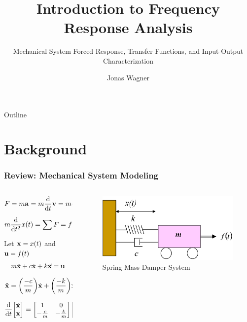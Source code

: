 \documentclass[aspectratio=169]{beamer}
\title[Frequency Response Analysis]{Introduction to Frequency Response Analysis}
\subtitle{Mechanical System Forced Response, Transfer Functions, and Input-Output Characterization}
\author{Jonas Wagner}
\institute[UTDallas]{The University of Texas at Dallas}
\date{}
\begin{document}
	
\begin{frame}
	\titlepage
\end{frame}


\begin{frame}{Outline}
	\tableofcontents
	\note{

	}
\end{frame}

\section{Background}
\begin{frame}
	\frametitle{Review: Mechanical System Modeling}
	\begin{columns}
		\begin{column}{0.5 \textwidth}
			\[F = m \vb{a} = m \dv{t} \vb{v} = m \dv{t} \qty(\dv{t} \vb{x})\]
			\[
				m \dv{t^2} x(t) 
				= \sum F 
				= f(t) - b \dv{t} x(t) - k x(t)
			\]

			Let $\vb{x} = x(t)$ and $\vb{u} = f(t)$
			\[
				m \ddot{\vb{x}} + c \dot{\vb{x}} + k \va{x} = \vb{u}
			\]
			\[
				\ddot{\vb{x}} 
				= \qty(\frac{-c}{m}) \dot{\vb{x}} + \qty(\frac{-k}{m}) \vb{x} + \qty(\cfrac{1}{m}) \vb{u}
			\]
			\[
				\dv{t} \mqty[
					\dot{\vb{x}}\\ 
					\vb{x}
				 ] = 
				\mqty[
					1 &0\\
					-\frac{c}{m} &-\frac{k}{m}
					] 
				\mqty[
					\dot{\vb{x}}\\
					\vb{x}
				]
				+ \mqty[
					0\\
					\frac{1}{m}
				]
				\mqty[\vb{u}]
			\]
		\end{column}
		\begin{column}{0.375 \textwidth}
			\begin{figure}[]
				\includegraphics[width=\textwidth]{Images/SpringMassDamper_cartSystem.png}
				Spring Mass Damper System \cite{ctms_engin_umich_SystemModeling}
			\end{figure}
		\end{column}
	\end{columns}
	\note{

	}
\end{frame}
\end{document}
